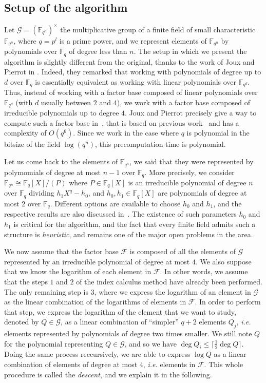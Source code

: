 \documentclass[a4paper,11pt]{article}
\theoremstyle{break}
\theoremstyle{sc}
\theoremstyle{definition}
\theoremstyle{remark}
\newcommand{\ie}{\emph{i.e. }}
\begin{document}
\subsection{Setup of the algorithm}

Let $\mathcal G = (\mathbb{F}_{q^n})^\times$ the multiplicative group of a finite
field of small characteristic $\mathbb{F}_{q^n}$, where $q=p^l$ is a prime
power, and we represent elements of $\mathbb{F}_{q^n}$ by polynomials over
$\mathbb{F}_q$ of degree less than $n$. The setup in which we present the algorithm is slightly different from
the original, thanks to the work of Joux and Pierrot in \cite{JP14}. Indeed,
they remarked that working with polynomials of degree up to $d$ over $\mathbb{F}_q$ is
essentially equivalent as working with linear polynomials over $\mathbb{F}_{q^d}$. Thus,
instead of working with a factor base composed of linear polynomials over
$\mathbb{F}_{q^d}$ (with $d$ usually between $2$ and $4$), we work with a
factor base composed of irreducible polynomials up to degree $4$. Joux and Pierrot
precisely give a way to compute such a factor base in~\cite{JP14}, that is based
on previous work~\cite{Joux13, BGJT13} and has a complexity of $O(q^6)$. Since
we work in the case where $q$ is polynomial in the bitsize of the field
$\log(q^n)$, this precomputation time is polynomial.

Let us come back to the elements of $\mathbb{F}_{q^n}$, we said that they were
represented by polymomials of degree at most $n-1$ over $\mathbb{F}_q$. More
precisely, we consider $\mathbb{F}_{q^n}\cong \mathbb{F}_{q}[X]/(P)$ where $P\in
\mathbb{F}_{q}[X]$ is an irreducible polynomial of degree $n$ over
$\mathbb{F}_{q}$ dividing $h_1X^q-h_0$, and $h_0, h_1\in \mathbb{F}_q[X]$ are
polynomials of degree at most $2$ over $\mathbb{F}_q$. Different options are
available to choose $h_0$ and $h_1$, and the respective results are also
discussed in~\cite{JP14}. The existence of such parameters $h_0$ and $h_1$ is
critical for the algorithm, and the fact that every finite field admits such a
structure is \emph{heuristic}, and remains one of the major open problems in the
area.

We now assume that the factor base $\mathcal F$ is composed of all the
elements of $\mathcal G$ represented by an irreducible polynomial of degree at
most $4$. We also suppose that we know the logarithm of each element in
$\mathcal F$. In other words, we assume that the steps $1$ and $2$ of the index
calculus method have already been performed. The only remaining step is $3$,
where we express the logarithm of an element in $\mathcal G$ as the linear
combination of the logarithms of elements in $\mathcal F$. In order to perform
that step, we express the logarithm of the element that we want to study, denoted by
$Q\in\mathcal G$, as a linear combination of ``simpler'' $q+2$ elements $Q_j$,
\ie elements represented by polynomials of degree two times smaller. We
still note $Q$ for the polynomial representing $Q\in
\mathcal G$, and so we have $\deg Q_i\leq \lceil \frac{1}{2}\deg Q\rceil$. Doing
the same process reccursively, we are able to express $\log Q$ as a linear
combination of elements of degree at most $4$, \ie elements in $\mathcal F$.
This whole procedure is called the \emph{descent}, and we explain it in the
following. 
\end{document}
